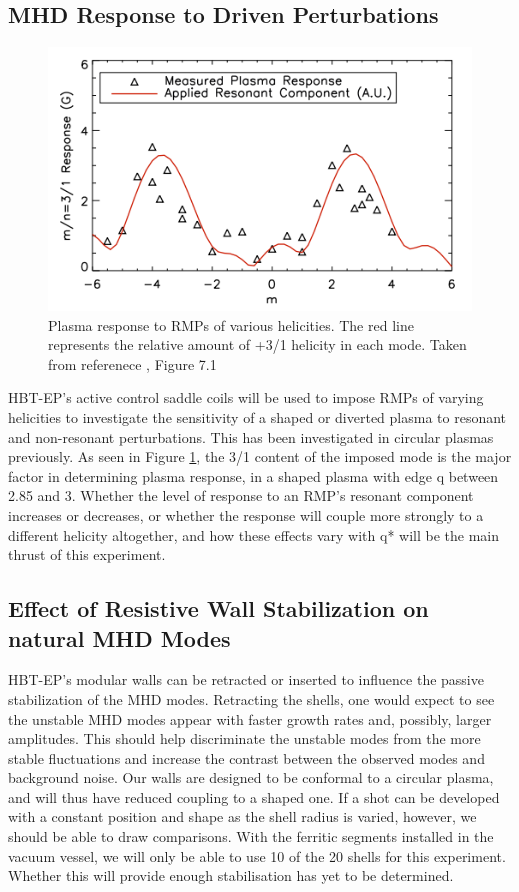 \documentclass[aps,preprint,showpacs,superscriptaddress,groupedaddress]{revtex4}  %
\begin{document}
	\subsection{MHD Response to Driven Perturbations}
\begin{figure}[b]
	\centering
\includegraphics[scale=.525]{../Plots/Shiraki_thesis_Fig_7_1.png}\caption{Plasma response to RMPs of various helicities.  The red line represents the relative amount of +3/1 helicity in each mode.  Taken from referenece \cite{Shiraki}, Figure 7.1}
	\label{Shiraki_plot}
	\end{figure}
HBT-EP's active control saddle coils will be used to impose RMPs of varying helicities to investigate the sensitivity of a shaped or diverted plasma to resonant and non-resonant perturbations.  This has been investigated in circular plasmas previously\cite{Shiraki}.  As seen in Figure \ref{Shiraki_plot}, the 3/1 content of the imposed mode is the major factor in determining plasma response, in a shaped plasma with edge q between 2.85 and 3.  Whether the level of response to an RMP's resonant component increases or decreases, or whether the response will couple more strongly to a different helicity altogether, and how these effects vary with q* will be the main thrust of this experiment.\par
	\subsection{Effect of Resistive Wall Stabilization on natural MHD Modes}	 
HBT-EP's modular walls can be retracted or inserted to influence the passive stabilization of the MHD modes.  Retracting the shells, one would expect to see the unstable MHD modes appear with faster growth rates and, possibly, larger amplitudes\cite{Shiraki}.  This should help discriminate the unstable modes from the more stable fluctuations and increase the contrast between the observed modes and background noise.  Our walls are designed to be conformal to a circular plasma, and will thus have reduced coupling to a shaped one. If a shot can be developed with a constant position and shape as the shell radius is varied, however, we should be able to draw comparisons.  With the ferritic segments installed in the vacuum vessel, we will only be able to use 10 of the 20 shells for this experiment.  Whether this will provide enough stabilisation has yet to be determined.\par
\end{document}
